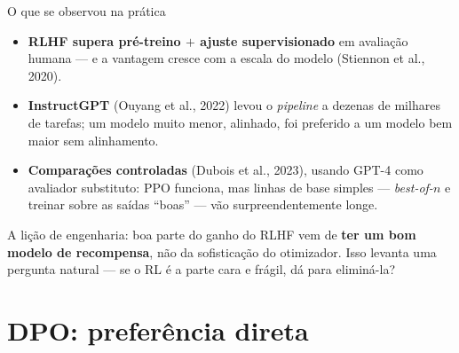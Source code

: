 \documentclass[aspectratio=169, 11pt]{beamer}
\begin{document}
\begin{frame}{O que se observou na prática}

  \begin{itemize}\setlength{\itemsep}{0.4ex}
    \item \textbf{RLHF supera pré-treino $+$ ajuste supervisionado} em avaliação
      humana --- e a vantagem cresce com a escala do modelo
      {\scriptsize(Stiennon et al., 2020)}.
    \item \textbf{InstructGPT} (Ouyang et al., 2022) levou o \emph{pipeline} a
      dezenas de milhares de tarefas; um modelo muito menor, alinhado, foi
      preferido a um modelo bem maior sem alinhamento.
    \item \textbf{Comparações controladas} (Dubois et al., 2023), usando GPT-4
      como avaliador substituto: PPO funciona, mas linhas de base simples ---
      \emph{best-of-$n$} e treinar sobre as saídas ``boas'' --- vão
      surpreendentemente longe.
  \end{itemize}

  \begin{ideiabox}
    A lição de engenharia: boa parte do ganho do RLHF vem de \textbf{ter um bom
    modelo de recompensa}, não da sofisticação do otimizador. Isso levanta uma
    pergunta natural --- se o RL é a parte cara e frágil, dá para eliminá-la?
  \end{ideiabox}
\end{frame}

\section{DPO: preferência direta}
\end{document}

